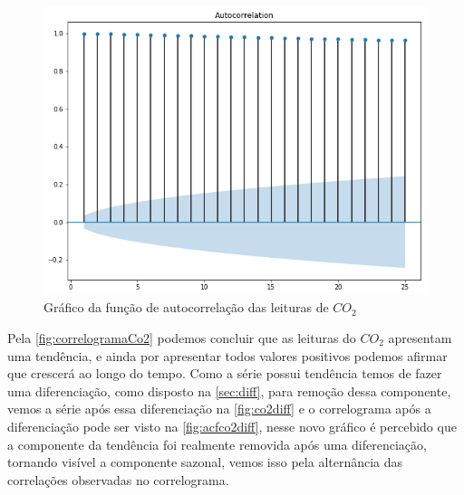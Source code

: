 \documentclass[
    12pt,
    oneside,
    a4paper,
    english,
    brazil
]{abntex2}
\begin{document}

\begin{figure}
    \centering
    \caption{Gráfico da função de autocorrelação das leituras de
        $CO_2$}\label{fig:correlogramaCo2}
    \includegraphics[width=.6\linewidth]{images/acf_co2.png}
\end{figure}

Pela \autoref{fig:correlogramaCo2}  podemos concluir que as  leituras do $CO_2$
apresentam  uma  tendência, e  ainda  por  apresentar todos  valores  positivos
podemos afirmar que  crescerá ao longo do tempo. Como  a série possui tendência
temos  de  fazer  uma   diferenciação,  como  disposto  na  \autoref{sec:diff},
para  remoção  dessa componente,  vemos  a  série  após essa  diferenciação  na
\autoref{fig:co2diff} e o  correlograma após a diferenciação pode  ser visto na
\autoref{fig:acfco2diff}, nesse  novo gráfico é  percebido que a  componente da
tendência foi  realmente removida  após uma  diferenciação, tornando  visível a
componente sazonal, vemos  isso pela alternância das  correlações observadas no
correlograma.
\end{document}

